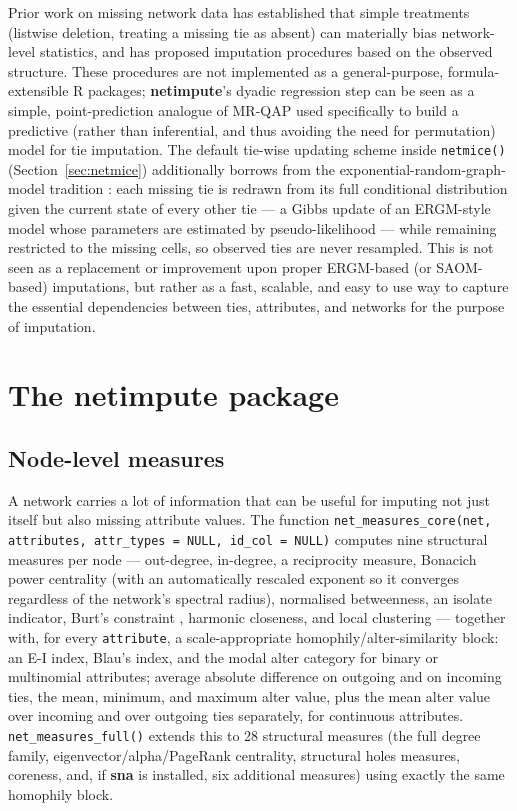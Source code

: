 \documentclass[11pt,a4paper]{article}
\newcommand{\pkg}[1]{\textbf{#1}}
\newcommand{\code}[1]{\texttt{#1}}
\newcommand{\proglang}[1]{\textsf{#1}}
\begin{document}
Prior work on missing network data \citep{Huisman2009,Krause2020} has
established that simple treatments (listwise deletion, treating a missing
tie as absent) can materially bias network-level statistics, and has
proposed imputation procedures based on the observed structure. These
procedures are
not implemented as a general-purpose, formula-extensible \proglang{R}
packages; \pkg{netimpute}'s dyadic regression step can be seen as a simple, point-prediction analogue of MR-QAP
\citep{Krackhardt1988} used specifically to build a predictive (rather than
inferential, and thus avoiding the need for permutation) model for tie imputation. The default tie-wise updating scheme
inside \code{netmice()} (Section~\ref{sec:netmice}) additionally borrows
from the exponential-random-graph-model tradition \citep{Robins2007}: each
missing tie is redrawn from its full conditional distribution given the
current state of every other tie --- a Gibbs update of an ERGM-style model
whose parameters are estimated by pseudo-likelihood --- while remaining
restricted to the missing cells, so observed ties are never resampled. This is not seen as a replacement or improvement upon proper ERGM-based (or SAOM-based) imputations, but rather as a fast, scalable, and easy to use way to capture the essential dependencies between ties, attributes, and networks for the purpose of imputation.

\section{The \pkg{netimpute} package}
\label{sec:package}

\subsection{Node-level measures}
\label{sec:measures}

A network carries a lot of information that can be useful for imputing not just
itself but also missing attribute values. The function
\code{net\_measures\_core(net, attributes, attr\_types = NULL, id\_col =
NULL)} computes nine structural measures per node --- out-degree,
in-degree, a reciprocity measure, Bonacich power centrality (with an
automatically rescaled exponent so it converges regardless of the network's
spectral radius), normalised betweenness, an isolate indicator, Burt's
constraint \citep{Burt1992}, harmonic closeness, and local clustering ---
together with, for every \code{attribute}, a
scale-appropriate homophily/alter-similarity block: an E-I index, Blau's
index, and the modal alter category for binary or multinomial attributes;
average absolute difference on outgoing and on incoming ties, the
mean, minimum, and maximum alter value, plus the mean alter value over
incoming and over outgoing ties separately, for continuous attributes.
\code{net\_measures\_full()} extends this to 28 structural measures
(the full degree family, eigenvector/alpha/PageRank centrality, structural
holes measures, coreness, and, if \pkg{sna} is installed, six
additional measures) using exactly the same homophily block.
\end{document}
